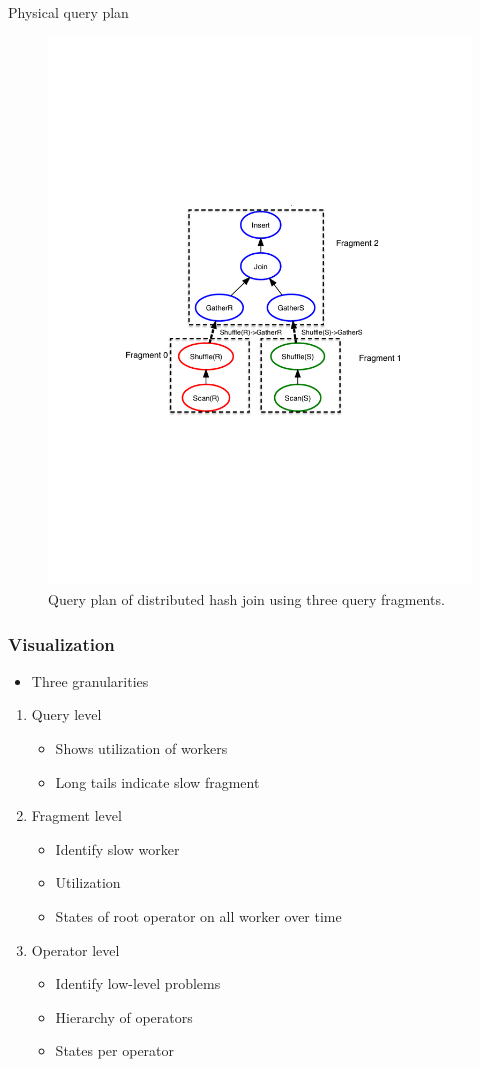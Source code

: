 \documentclass[mathserif,serif,handout]{beamer}
\begin{document}
\begin{frame}{Physical query plan}
\begin{figure}
 \begin{center}
     \includegraphics[width=.7\textwidth]{join}
   \end{center}
  \caption{Query plan of distributed hash join using three query fragments.}
\end{figure}
\end{frame}

\begin{frame}
\frametitle{Visualization}
\begin{itemize}
  \item Three granularities
\end{itemize}
\begin{enumerate}
  \item Query level
  \begin{itemize}
    \item Shows utilization of workers
    \item Long tails indicate slow fragment
  \end{itemize}
  \item Fragment level
  \begin{itemize}
    \item Identify slow worker
    \item Utilization
    \item States of root operator on all worker over time
  \end{itemize}
  \item Operator level
  \begin{itemize}
    \item Identify low\--level problems
    \item Hierarchy of operators
    \item States per operator
  \end{itemize}
\end{enumerate}
\end{frame}
\end{document}
